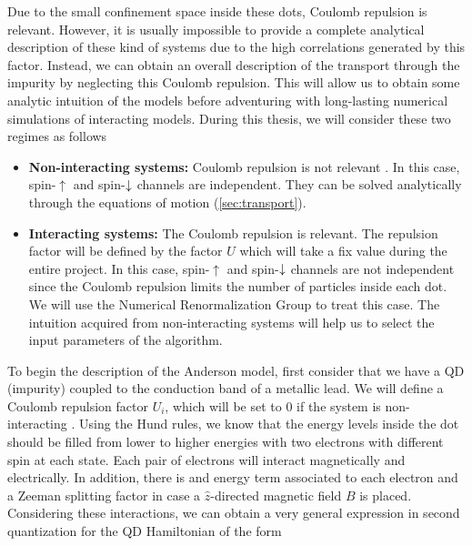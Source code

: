  Due to the small confinement space inside these dots,  Coulomb repulsion is relevant. However, it is usually impossible to provide a complete analytical description of these kind of systems due to the high correlations generated by this factor. Instead, we can obtain an overall description of the transport through the impurity by neglecting this Coulomb repulsion. This will allow us to obtain some analytic intuition of the models  before adventuring with long-lasting numerical simulations of interacting models. During this thesis, we will consider these two regimes as follows
\begin{itemize}
    \item \textbf{Non-interacting systems:} Coulomb repulsion is not relevant . In this case, spin-$\uparrow$ and spin-$\downarrow$ channels are independent. They can be solved analytically through the equations of motion (\ref{sec:transport}). 

    \item \textbf{Interacting systems:} The Coulomb repulsion is relevant. The repulsion factor will be defined by the factor $U$ which will take a fix value during the entire project. In this case, spin-$\uparrow$ and spin-$\downarrow$ channels are not independent since the Coulomb repulsion limits the number of particles inside each dot. We will use the Numerical Renormalization Group to treat this case. The intuition acquired from non-interacting systems will help us to select the input parameters of the algorithm.  
\end{itemize}



To begin the description of the Anderson model, first consider that we have a QD (impurity) coupled to the conduction band of a metallic lead. We will define a Coulomb repulsion factor $U_i$, which will be set to $0$ if the system is non-interacting . Using the Hund rules, we know that the energy levels inside the dot should be filled from lower to higher energies with two electrons with different spin at each state. Each pair of electrons will interact magnetically and electrically. In addition, there is and energy term associated to each electron and a Zeeman splitting factor in case a $\hat{z}$-directed magnetic field $B$ is placed.  Considering these interactions, we can obtain a very general expression in second quantization for the QD Hamiltonian
of the form \citep[(3.2)]{sindel_numerical_2005}

